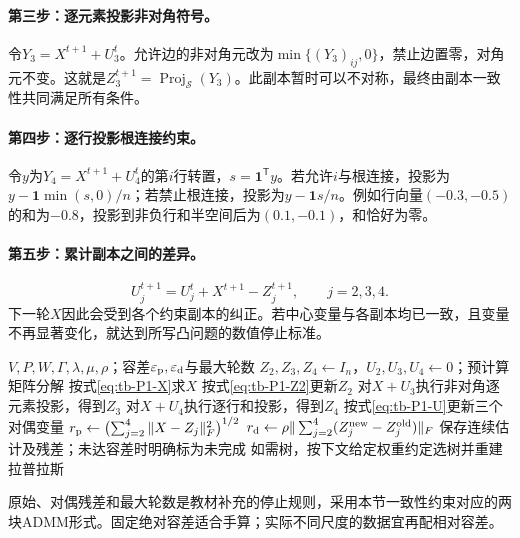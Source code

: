 \paragraph{第三步：逐元素投影非对角符号。}
令$Y_3=X^{t+1}+U_3^t$。允许边的非对角元改为$\min\{(Y_3)_{ij},0\}$，禁止边置零，对角元不变。这就是$Z_3^{t+1}=\operatorname{Proj}_{\mathcal S}(Y_3)$。此副本暂时可以不对称，最终由副本一致性共同满足所有条件。

\paragraph{第四步：逐行投影根连接约束。}
令$y$为$Y_4=X^{t+1}+U_4^t$的第$i$行转置，$s=\mathbf1^{\mathsf T}y$。若允许$i$与根连接，投影为
$y-\mathbf1\min(s,0)/n$；若禁止根连接，投影为$y-\mathbf1s/n$。例如行向量$(-0.3,-0.5)$的和为$-0.8$，投影到非负行和半空间后为$(0.1,-0.1)$，和恰好为零。

\paragraph{第五步：累计副本之间的差异。}
\begin{equation}
 U_j^{t+1}=U_j^t+X^{t+1}-Z_j^{t+1},\qquad j=2,3,4.
 \label{eq:tb-P1-U}
\end{equation}
下一轮$X$因此会受到各个约束副本的纠正。若中心变量与各副本均已一致，且变量不再显著变化，就达到所写凸问题的数值停止标准。

\begin{algorithm}[htbp]
\caption{P1拉普拉斯估计：四副本ADMM的等价代数整理}
\label{alg:tb-P1-ADMM}
\begin{algorithmic}[1]
\Require $V,P,W,\Gamma,\lambda,\mu,\rho$；容差$\varepsilon_{\rm p},\varepsilon_{\rm d}$与最大轮数
\State $Z_2,Z_3,Z_4\gets I_n$，$U_2,U_3,U_4\gets0$；预计算矩阵分解
\Repeat
 \State 按式\eqref{eq:tb-P1-X}求$X$
 \State 按式\eqref{eq:tb-P1-Z2}更新$Z_2$
 \State 对$X+U_3$执行非对角逐元素投影，得到$Z_3$
 \State 对$X+U_4$执行逐行和投影，得到$Z_4$
 \State 按式\eqref{eq:tb-P1-U}更新三个对偶变量
 \State $r_{\rm p}\gets\bigl(\sum_{j=2}^4\|X-Z_j\|_F^2\bigr)^{1/2}$
 \State $r_{\rm d}\gets\rho\|\sum_{j=2}^4(Z_j^{\rm new}-Z_j^{\rm old})\|_F$
\State 保存连续估计及残差；未达容差时明确标为未完成
\State 如需树，按下文给定权重约定选树并重建拉普拉斯
\end{algorithmic}
\end{algorithm}
原始、对偶残差和最大轮数是教材补充的停止规则，采用本节一致性约束对应的两块ADMM形式。固定绝对容差适合手算；实际不同尺度的数据宜再配相对容差。

